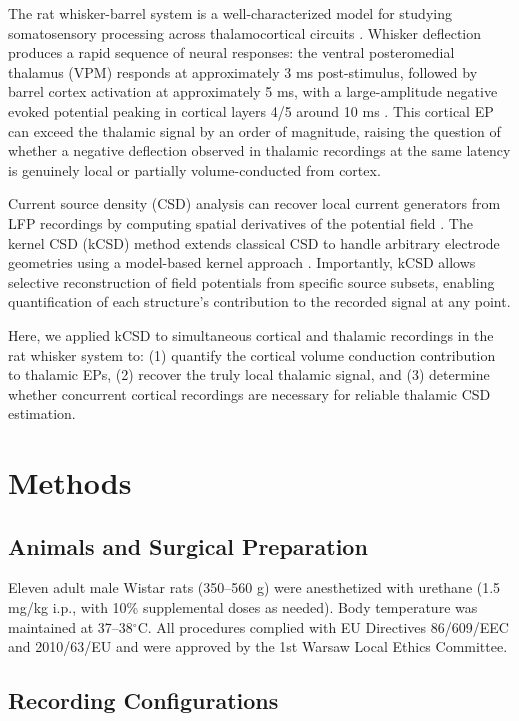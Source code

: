 \documentclass[12pt]{article}
\begin{document}
The rat whisker-barrel system is a well-characterized model for studying somatosensory processing across thalamocortical circuits \citep{petersen2007barrel, swadlow2003thalamocortical}. Whisker deflection produces a rapid sequence of neural responses: the ventral posteromedial thalamus (VPM) responds at approximately 3 ms post-stimulus, followed by barrel cortex activation at approximately 5 ms, with a large-amplitude negative evoked potential peaking in cortical layers 4/5 around 10 ms \citep{nicolelis1995somatotopic}. This cortical EP can exceed the thalamic signal by an order of magnitude, raising the question of whether a negative deflection observed in thalamic recordings at the same latency is genuinely local or partially volume-conducted from cortex.

Current source density (CSD) analysis can recover local current generators from LFP recordings by computing spatial derivatives of the potential field \citep{mitzdorf1985current}. The kernel CSD (kCSD) method extends classical CSD to handle arbitrary electrode geometries using a model-based kernel approach \citep{potworowski2012kcsd, leski2011inverse}. Importantly, kCSD allows selective reconstruction of field potentials from specific source subsets, enabling quantification of each structure's contribution to the recorded signal at any point.

Here, we applied kCSD to simultaneous cortical and thalamic recordings in the rat whisker system to: (1) quantify the cortical volume conduction contribution to thalamic EPs, (2) recover the truly local thalamic signal, and (3) determine whether concurrent cortical recordings are necessary for reliable thalamic CSD estimation.

\section{Methods}

\subsection{Animals and Surgical Preparation}

Eleven adult male Wistar rats (350--560 g) were anesthetized with urethane (1.5 mg/kg i.p., with 10\% supplemental doses as needed). Body temperature was maintained at 37--38$^\circ$C. All procedures complied with EU Directives 86/609/EEC and 2010/63/EU and were approved by the 1st Warsaw Local Ethics Committee.

\subsection{Recording Configurations}
\end{document}
